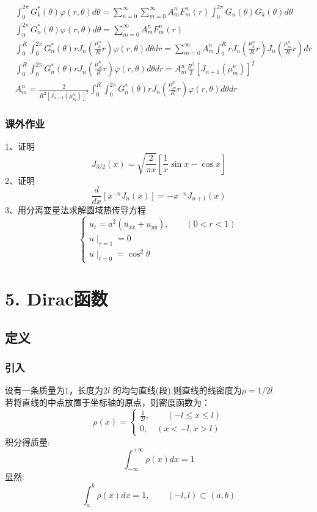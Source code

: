 \begin{frame}
	\begin{equation*}
		\begin{split}
				 &\int_0 ^{2\pi} G_k ^* (\theta) \varphi(r, \theta) d\theta =\sum_{n=0}^{\infty} \sum_{m=0}^{\infty} A_m ^n F_m ^n (r) \int_0 ^{2\pi} G_n(\theta) G_k(\theta) d\theta	\\ 
				 &\int_0 ^{2\pi} G_n  ^* (\theta) \varphi(r, \theta) d\theta = \sum_{m=0}^{\infty} A_m ^n F_m ^n (r)\\ 
				 &\int_0 ^{R} \int_0 ^{2\pi} G_n ^* (\theta) r J_n (\frac{\mu_{k}^{n}}{R}r) \varphi(r, \theta) d\theta dr = \sum_{m=0}^{\infty} A_m ^n \int_0 ^{R} r J_n (\frac{\mu_{k}^{n}}{R}r)J_n (\frac{\mu_{m}^{n}}{R}r) dr \\
				 &\int_0 ^{R} \int_0 ^{2\pi} G_n ^* (\theta) r J_n (\frac{\mu_{m}^{n}}{R}r) \varphi(r, \theta) d\theta dr = A_m ^n \frac{R^2}{2} [J_{n+1}(\mu_m ^n)]^2\\ 
				 &A_m ^n=	\frac{2}{R^2[J_{n+1}(\mu_m ^n)]^2} \int_0 ^{R} \int_0 ^{2\pi} G_n ^* (\theta) r J_n (\frac{\mu_{m}^{n}}{R}r) \varphi(r, \theta) d\theta dr 
		\end{split}
	\end{equation*}
\end{frame}	

\begin{frame}
	\frametitle{课外作业}
	1、证明 
	\begin{equation*}
		J_{3/2}(x)=\sqrt{\frac{2}{\pi x}} [\frac{1}{x}\sin x -\cos x]
	\end{equation*}
	2、证明
	\begin{equation*}
		\frac{d}{d x}\left[x^{-n} J_{n}(x)\right]=-x^{-n} J_{n+1}(x) 
	\end{equation*}	
	3、用分离变量法求解圆域热传导方程
	\[\begin{cases}
		u_t=a^2 (u_{xx}+u_{yy}), \qquad (0<r<1) \\
		u\mid_{r=1}=0 \\
		u\mid_{t=0}=\cos^2\theta
	\end{cases}\]	
\end{frame}	

\section{5. Dirac函数}
\subsection{定义}
\begin{frame}
	  \frametitle{引入}
	  {\Bullet}设有一条质量为$1$，长度为$2l$ 的均匀直线(段).则直线的线密度为$\rho=1/2l$\\
	  若将直线的中点放置于坐标轴的原点，则密度函数为： 
	  \[\rho(x)=\left\{\begin{array}{c}
		\frac{1}{2 l}, \qquad (-l \leq x \leq l) \\
		0, \quad (x<-l, x>l)
		\end{array}\right.\]
	 积分得质量:
	 \[\int_{-\infty}^{+\infty} \rho(x) d x= 1\]
	 显然:
	 \[\int_{a}^{b} \rho(x) d x =1, \qquad (-l,l) \subset (a,b) \]
\end{frame}

